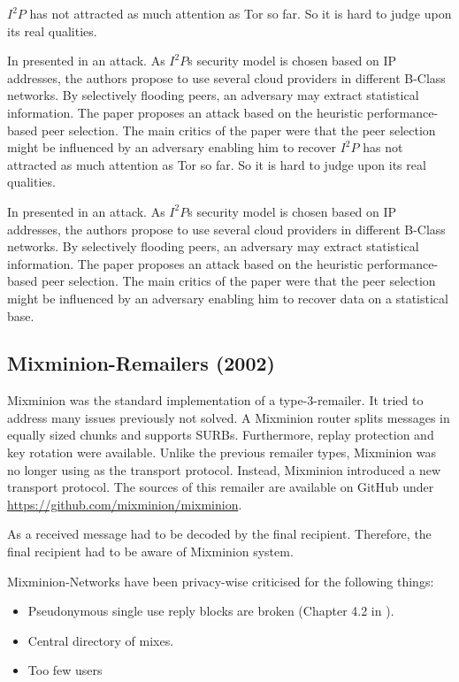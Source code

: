 $I^2P$ has not attracted as much attention as Tor so far. So it is hard to judge upon its real qualities.

In \citeyear{pets2011-i2p} \citeauthor{pets2011-i2p} presented in \cite{pets2011-i2p} an attack. As $I^2P$s security model is chosen based on IP addresses, the authors propose to use several cloud providers in different B-Class networks. By selectively flooding peers, an adversary may extract statistical information. The paper proposes an attack based on the heuristic performance-based peer selection. The main critics of the paper were that the peer selection might be influenced by an adversary enabling him to recover $I^2P$ has not attracted as much attention as Tor so far. So it is hard to judge upon its real qualities.

In \citeyear{pets2011-i2p} \citeauthor{pets2011-i2p} presented in \cite{pets2011-i2p} an attack. As $I^2P$s security model is chosen based on IP addresses, the authors propose to use several cloud providers in different B-Class networks. By selectively flooding peers, an adversary may extract statistical information. The paper proposes an attack based on the heuristic performance-based peer selection. The main critics of the paper were that the peer selection might be influenced by an adversary enabling him to recover data on a statistical base.

\subsection{Mixminion-Remailers (2002)\label{sec:remMixminion}}
Mixminion was the standard implementation of a type-3-remailer. It tried to address many issues previously not solved. A Mixminion router splits messages in equally sized chunks and supports SURBs. Furthermore,  replay protection and key rotation were available. Unlike the previous remailer types, Mixminion was no longer using  as the transport protocol. Instead, Mixminion introduced a new transport protocol. The sources of this remailer are available on GitHub under \url{https://github.com/mixminion/mixminion}.

As a received message had to be decoded by the final recipient. Therefore, the final recipient had to be aware of Mixminion system.

Mixminion-Networks have been privacy-wise criticised for the following things: 
\begin{itemize}
	\item Pseudonymous single use reply blocks are broken (Chapter 4.2 in \cite{sassamanpynchon}).
	\item Central directory of mixes.
	\item Too few users
\end{itemize}

